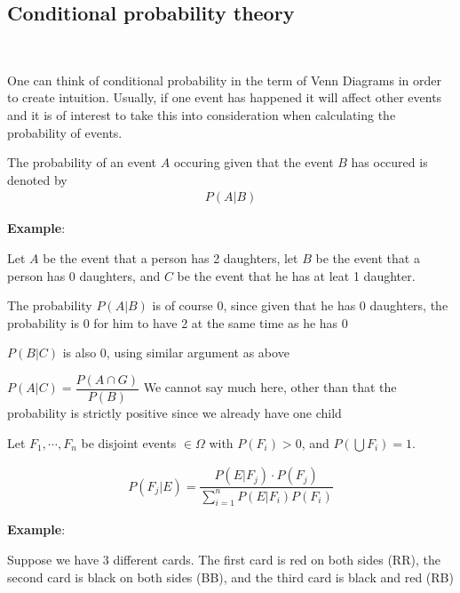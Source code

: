 \subsection{Conditional probability theory}\hfill\\\par
\noindent One can think of conditional probability in the term of Venn Diagrams in order to create intuition. Usually, if one event has happened it will affect other events and it is of interest to take this into consideration when calculating the probability of events. 
\par\bigskip
\noindent The probability of an event $A$ occuring given that the event $B$ has occured is denoted by
\begin{equation*}
  \begin{gathered}
    P(A|B)
  \end{gathered}
\end{equation*}
\par\bigskip
\noindent\textbf{Example}:\par
Let $A$ be the event that a person has 2 daughters, let $B$ be the event that a person has 0 daughters, and $C$ be the event that he has at leat 1 daughter.
\par\bigskip
\noindent The probability $P(A|B)$ is of course 0, since given that he has 0 daughters, the probability is 0 for him to have 2 at the same time as he has 0
\par\bigskip
\noindent $P(B|C)$ is also 0, using similar argument as above
\par\bigskip
\noindent $P(A|C) = \dfrac{P(A\cap G)}{P(B)}$ We cannot say much here, other than that the probability is strictly positive since we already have one child
\par\bigskip
\begin{theo}{}
  Let $F_1,\cdots, F_n$ be disjoint events $\in\Omega$ with $P(F_i)>0$, and $P(\bigcup F_i) = 1$. 
  \par\bigskip
  \begin{equation*}
    \begin{gathered}
      P(F_j|E) = \dfrac{P(E|F_j)\cdot P(F_j)}{\sum_{i=1}^{n}P(E|F_i)P(F_i)}
    \end{gathered}
  \end{equation*}
\end{theo}
\par\bigskip
\noindent\textbf{Example}:\par
\noindent Suppose we have 3 different cards. The first card is red on both sides (RR), the second card is black on both sides (BB), and the third card is black and red (RB)
